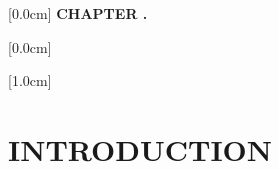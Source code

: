 \documentclass[a4paper,13pt,3p,twoside]{report}
\begin{document}

\pagestyle{empty}

\newpage


\newpage


\newpage
{}
\renewcommand*\contentsname{TABLE OF CONTENTS}
    [0.0cm]             %
    {\bfseries\vspace{0.3cm}}                  %
    {{\bfseries{\scshape} CHAPTER \thecontentslabel.\ }} %
    {}         %
    {\contentspage}         %
    
    [0.0cm]             %
    {\vspace{0.3cm}}                  %
    {\thecontentslabel \ } %
    {}         %
    {\contentspage}         %
    
    [1.0cm]             %
    {\vspace{0.3cm}}                  %
    {\thecontentslabel \ } %
    {}         %
    {\contentspage}         %

\tableofcontents 
\thispagestyle{empty}
\cleardoublepage

\renewcommand{\listfigurename}{LIST OF FIGURES}
{\let\oldnumberline\numberline
\renewcommand{\numberline}{Figure~\oldnumberline}
\listoffigures} 
\newpage

\renewcommand{\listtablename}{LIST OF TABLES}
{\let\oldnumberline\numberline
\renewcommand{\numberline}{Table~\oldnumberline}
\listoftables}

\glsaddall 
\renewcommand*{\acronymname}{LIST OF ABBREVIATIONS}
\renewcommand*{\entryname}{Abbreviation}
\renewcommand*{\descriptionname}{Definition}
\printnoidxglossaries

\renewcommand\appendixname{APPENDIX}
\renewcommand\appendixpagename{APPENDIX}
\renewcommand\appendixtocname{APPENDIX}

\renewcommand{\figurename}{Figure}
\renewcommand{\tablename}{Table}
\renewcommand{\chaptername}{CHAPTER}

\newpage
\chapter{INTRODUCTION}

\end{document}
